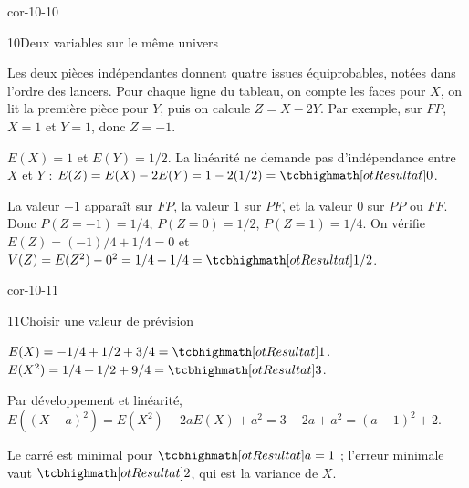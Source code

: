 \begin{blocLivre}{cor-10-10}
\begin{corrige}{10}{Deux variables sur le même univers}
\begin{questions}
\item Les deux pièces indépendantes donnent quatre issues équiprobables, notées dans l’ordre des lancers.
Pour chaque ligne du tableau, on compte les faces pour $X$, on lit la première pièce pour $Y$, puis on calcule $Z=X-2Y$.
Par exemple, sur $FP$, $X=1$ et $Y=1$, donc $Z=-1$.
\item $E(X)=1$ et $E(Y)=1/2$. La linéarité ne demande pas d’indépendance entre $X$ et $Y$ :
$E(Z)=E(X)-2E(Y)=1-2(1/2)=\res{0}$.
\item La valeur $-1$ apparaît sur $FP$, la valeur 1 sur $PF$, et la valeur 0 sur $PP$ ou $FF$.
Donc $P(Z=-1)=1/4$, $P(Z=0)=1/2$, $P(Z=1)=1/4$.
On vérifie $E(Z)=(-1)/4+1/4=0$ et
$V(Z)=E(Z^2)-0^2=1/4+1/4=\res{1/2}$.
\end{questions}

\label{figlivre-r10-10-issues-cor}

\end{corrige}
\end{blocLivre}
\begin{blocLivre}{cor-10-11}
\begin{corrige}{11}{Choisir une valeur de prévision}
\begin{questions}
\item $E(X)=-1/4+1/2+3/4=\res{1}$. $E(X^2)=1/4+1/2+9/4=\res{3}$.
\item Par développement et linéarité, $E((X-a)^2)=E(X^2)-2aE(X)+a^2=3-2a+a^2=(a-1)^2+2$.
\item Le carré est minimal pour $\res{a=1}$ ; l’erreur minimale vaut $\res{2}$, qui est la variance de $X$.
\end{questions}
\end{corrige}
\end{blocLivre}
